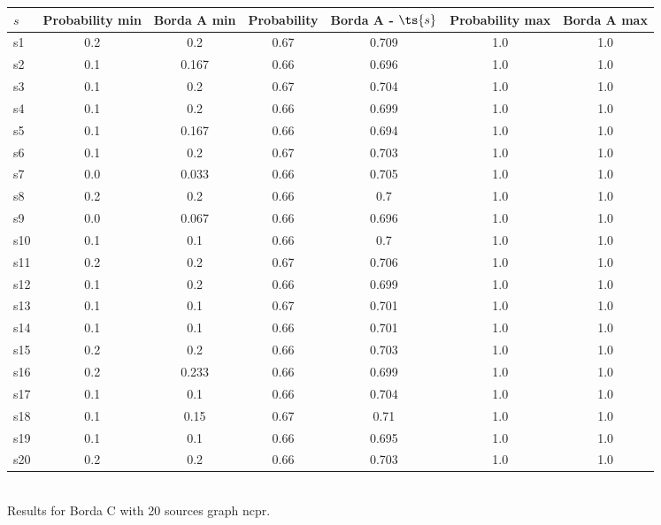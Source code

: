 \documentclass{article}
\begin{document}
\noindent\begin{tabular}{|l|c|c|c|c|c|c|}
\hline
$s$& Probability min & Borda A min & Probability & Borda A - $\ts{s}$ & Probability max & Borda A max\\
\hline
s1 &0.2 & 0.2 & 0.67 & 0.709 & 1.0 & 1.0\\
\hline
s2 &0.1 & 0.167 & 0.66 & 0.696 & 1.0 & 1.0\\
\hline
s3 &0.1 & 0.2 & 0.67 & 0.704 & 1.0 & 1.0\\
\hline
s4 &0.1 & 0.2 & 0.66 & 0.699 & 1.0 & 1.0\\
\hline
s5 &0.1 & 0.167 & 0.66 & 0.694 & 1.0 & 1.0\\
\hline
s6 &0.1 & 0.2 & 0.67 & 0.703 & 1.0 & 1.0\\
\hline
s7 &0.0 & 0.033 & 0.66 & 0.705 & 1.0 & 1.0\\
\hline
s8 &0.2 & 0.2 & 0.66 & 0.7 & 1.0 & 1.0\\
\hline
s9 &0.0 & 0.067 & 0.66 & 0.696 & 1.0 & 1.0\\
\hline
s10 &0.1 & 0.1 & 0.66 & 0.7 & 1.0 & 1.0\\
\hline
s11 &0.2 & 0.2 & 0.67 & 0.706 & 1.0 & 1.0\\
\hline
s12 &0.1 & 0.2 & 0.66 & 0.699 & 1.0 & 1.0\\
\hline
s13 &0.1 & 0.1 & 0.67 & 0.701 & 1.0 & 1.0\\
\hline
s14 &0.1 & 0.1 & 0.66 & 0.701 & 1.0 & 1.0\\
\hline
s15 &0.2 & 0.2 & 0.66 & 0.703 & 1.0 & 1.0\\
\hline
s16 &0.2 & 0.233 & 0.66 & 0.699 & 1.0 & 1.0\\
\hline
s17 &0.1 & 0.1 & 0.66 & 0.704 & 1.0 & 1.0\\
\hline
s18 &0.1 & 0.15 & 0.67 & 0.71 & 1.0 & 1.0\\
\hline
s19 &0.1 & 0.1 & 0.66 & 0.695 & 1.0 & 1.0\\
\hline
s20 &0.2 & 0.2 & 0.66 & 0.703 & 1.0 & 1.0\\
\hline
\end{tabular}\\

\noindent Results for Borda C with 20 sources graph ncpr.
\end{document}
